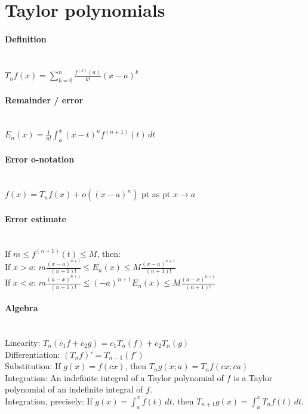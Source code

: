 \documentclass[10pt]{article}
\begin{document}
\bigskip\bigskip
\section{Taylor polynomials}\smallskip

\paragraph{Definition}\ \\
$T_n f(x) = \sum_{k=0}^n \frac{f^{(k)}(a)}{k!} (x-a)^k$

\paragraph{Remainder / error}\ \\
$E_n(x)=\frac{1}{n!}\int_a^x(x-t)^nf^{(n+1)}(t)\,dt$

\paragraph{Error o-notation}\ \\
$f(x)=T_nf(x) + o((x-a)^n)$  pt as  pt $x \to a$

\paragraph{Error estimate}\ \\
If $m \leq f^{(n+1)}(t) \leq M$, then:\\
If $x>a$: $m\frac{(x-a)^{n+1}}{(n+1)!} \leq E_n(x) \leq M\frac{(x-a)^{n+1}}{(n+1)!}$\\
If $x<a$: $m\frac{(a-x)^{n+1}}{(n+1)!} \leq (-a)^{n+1}E_n(x) \leq M\frac{(a-x)^{n+1}}{(n+1)!}$

\paragraph{Algebra}\ \\
Linearity: $T_n(c_1f+c_2g) = c_1T_n(f)+c_2T_n(g)$\\
Differentiation: $(T_nf)' = T_{n-1}(f')$\\
Substitution: If $g(x)=f(cx)$, then $T_ng(x;a)=T_nf(cx;ca)$\\
Integration: An indefinite integral of a Taylor polynomial of $f$ is a Taylor
polynomial of an indefinite integral of $f$.\\
Integration, precisely: If $g(x)=\int_a^xf(t)\,dt$,
then $T_{n+1}g(x)=\int_a^xT_nf(t)\,dt$.
\end{document}
